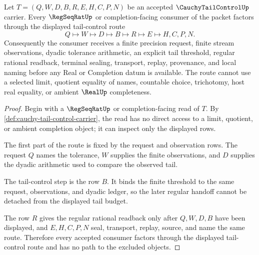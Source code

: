 \begin{theorem}
\label{thm:cauchy-tail-control-regseqrat-handoff}
Let $T=(Q,W,D,B,R,E,H,C,P,N)$ be an accepted $\CauchyTailControlUp$ carrier. Every $\RegSeqRatUp$ or completion-facing consumer of the packet factors through the displayed tail-control route
$$
Q \longmapsto W \longmapsto D \longmapsto B \longmapsto R \longmapsto E \longmapsto H,C,P,N .
$$
Consequently the consumer receives a finite precision request, finite stream observations, dyadic tolerance arithmetic, an explicit tail threshold, regular rational readback, terminal sealing, transport, replay, provenance, and local naming before any Real or Completion datum is available. The route cannot use a selected limit, quotient equality of names, countable choice, trichotomy, host real equality, or ambient $\RealUp$ completeness.
\end{theorem}
\begin{proof}
Begin with a $\RegSeqRatUp$ or completion-facing read of $T$. By \autoref{def:cauchy-tail-control-carrier}, the read has no direct access to a limit, quotient, or ambient completion object; it can inspect only the displayed rows.

The first part of the route is fixed by the request and observation rows. The request $Q$ names the tolerance, $W$ supplies the finite observations, and $D$ supplies the dyadic arithmetic used to compare the observed tail.

The tail-control step is the row $B$. It binds the finite threshold to the same request, observations, and dyadic ledger, so the later regular handoff cannot be detached from the displayed tail budget.

The row $R$ gives the regular rational readback only after $Q,W,D,B$ have been displayed, and $E,H,C,P,N$ seal, transport, replay, source, and name the same route. Therefore every accepted consumer factors through the displayed tail-control route and has no path to the excluded objects.
\end{proof}



